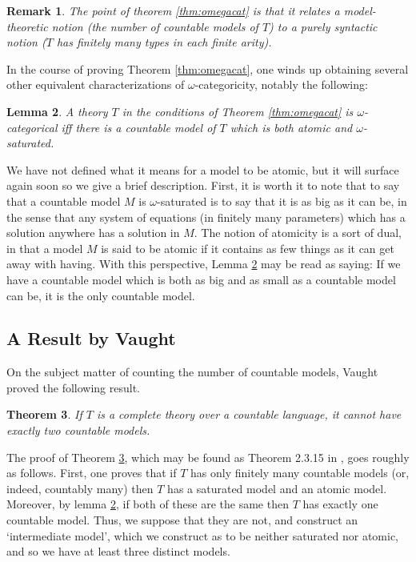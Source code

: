 \documentclass{article}
\newtheorem{theorem}{Theorem}[section]
\newtheorem{lemma}[theorem]{Lemma}
\newtheorem{remark}[theorem]{Remark}
\theoremstyle{nonumberplain}
\begin{document}
\begin{remark}
The point of theorem \ref{thm:omegacat} is that it relates a model-theoretic notion (the number of countable models of $T$) to a purely syntactic notion ($T$ has finitely many types in each finite arity).
\end{remark}

In the course of proving Theorem \ref{thm:omegacat}, one winds up obtaining several other equivalent characterizations of $\omega$-categoricity, notably the following:
\begin{lemma}\label{lem:omegacat}
A theory $T$ in the conditions of Theorem \ref{thm:omegacat} is $\omega$-categorical iff there is a countable model of $T$ which is both atomic and $\omega$-saturated.
\end{lemma}

We have not defined what it means for a model to be atomic, but it will surface again soon so we give a brief description. First, it is worth it to note that to say that a countable model $M$ is $\omega$-saturated is to say that it is as big as it can be, in the sense that any system of equations (in finitely many parameters) which has a solution anywhere has a solution in $M$. The notion of atomicity is a sort of dual, in that a model $M$ is said to be atomic if it contains as few things as it can get away with having. With this perspective, Lemma \ref{lem:omegacat} may be read as saying: If we have a countable model which is both as big and as small as a countable model can be, it is the only countable model.

\subsection{A Result by Vaught}

On the subject matter of counting the number of countable models, Vaught proved the following result.

\begin{theorem}\label{thm:vaught}
If $T$ is a complete theory over a countable language, it cannot have exactly two countable models.
\end{theorem}

The proof of Theorem \ref{thm:vaught}, which may be found as Theorem 2.3.15 in \cite{cnk}, goes roughly as follows. First, one proves that if $T$ has only finitely many countable models (or, indeed, countably many) then $T$ has a saturated model and an atomic model. Moreover, by lemma \ref{lem:omegacat}, if both of these are the same then $T$ has exactly one countable model. Thus, we suppose that they are not, and construct an `intermediate model', which we construct as to be neither saturated nor atomic, and so we have at least three distinct models.
\end{document}
